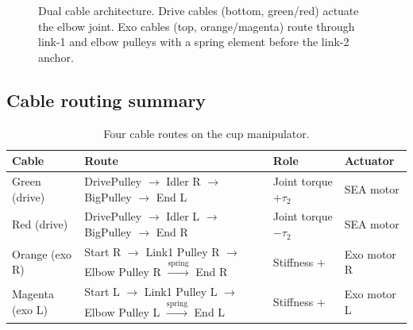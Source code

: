 \documentclass[11pt, a4paper]{article}
\begin{document}
\begin{figure}[h]
\caption{Dual cable architecture.  Drive cables (bottom, green/red) actuate
the elbow joint.  Exo cables (top, orange/magenta) route through link-1 and
elbow pulleys with a spring element before the link-2 anchor.}
\label{fig:architecture}
\end{figure}

\subsection{Cable routing summary}

\begin{table}[h]
\centering
\begin{tabular}{@{}llll@{}}
\toprule
\textbf{Cable}  & \textbf{Route} & \textbf{Role} & \textbf{Actuator} \\
\midrule
Green (drive)  & DrivePulley $\to$ Idler R $\to$ BigPulley $\to$ End L
               & Joint torque $+\tau_2$ & SEA motor \\
Red (drive)    & DrivePulley $\to$ Idler L $\to$ BigPulley $\to$ End R
               & Joint torque $-\tau_2$ & SEA motor \\
\midrule
Orange (exo R) & Start R $\to$ Link1 Pulley R $\to$ Elbow Pulley R
               $\xrightarrow{\text{spring}}$ End R
               & Stiffness $+$ & Exo motor R \\
Magenta (exo L)& Start L $\to$ Link1 Pulley L $\to$ Elbow Pulley L
               $\xrightarrow{\text{spring}}$ End L
               & Stiffness $+$ & Exo motor L \\
\bottomrule
\end{tabular}
\caption{Four cable routes on the cup manipulator.}
\label{tab:cables}
\end{table}
\end{document}

